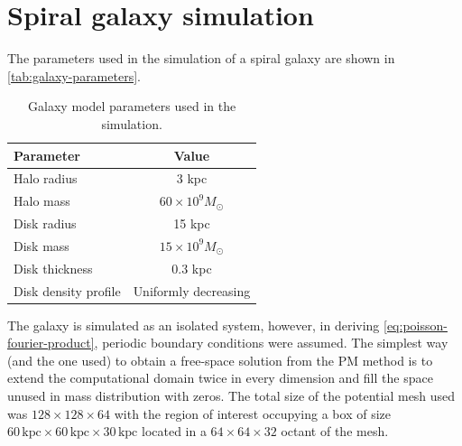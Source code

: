 \section{Spiral galaxy simulation}\label{sec:spiral-galaxy-sim}
The parameters used in the simulation of a spiral galaxy are shown in \autoref{tab:galaxy-parameters}.
\begin{table}[htp]
    \centering
    \begin{tabular}{|l|c|}
        \hline
        \textbf{Parameter}   & \textbf{Value}           \\
        \hline
        Halo radius          & 3 kpc                    \\
        Halo mass            & $60 \times 10^9 M_\odot$ \\
        Disk radius          & 15 kpc                   \\
        Disk mass            & $15 \times 10^9 M_\odot$ \\
        Disk thickness       & 0.3 kpc                  \\
        Disk density profile & Uniformly decreasing     \\
        \hline
    \end{tabular}
    \caption{Galaxy model parameters used in the simulation.}
    \label{tab:galaxy-parameters}
\end{table}
The galaxy is simulated as an isolated system, however, in deriving \autoref{eq:poisson-fourier-product}, periodic boundary conditions were assumed.
The simplest way (and the one used) to obtain a free-space solution from the PM method is to extend the computational domain twice in every dimension and fill the space unused in mass distribution with zeros.
The total size of the potential mesh used was $128 \times 128 \times 64$ with the region of interest occupying a box of size $60\, \text{kpc}\times 60\, \text{kpc}\times 30\, \text{kpc}$ located in a $64 \times 64 \times 32$ octant of the mesh.

